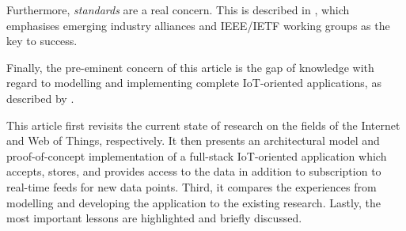 Furthermore, \textit{standards} are a real concern. This is described in \textcite{palattella-accettura-vilajosana-watteyne-gieco-boggia-dohler:standardized-protocol-stack-for-the-internet-of-important-things:2012}, which emphasises emerging industry alliances and IEEE/IETF working groups as the key to success.

Finally, the pre-eminent concern of this article is the gap of knowledge with regard to modelling and implementing complete IoT-oriented applications, as described by \textcite{paganelli-turchi-guili:a-web-of-things-framework-for-restful-applications-and-its-experimentation-in-a-smart-city:2014}.

This article first revisits the current state of research on the fields of the Internet and Web of Things, respectively. It then presents an architectural model and proof-of-concept implementation of a full-stack IoT-oriented application which accepts, stores, and provides access to the data in addition to subscription to real-time feeds for new data points. Third, it compares the experiences from modelling and developing the application to the existing research. Lastly, the most important lessons are highlighted and briefly discussed.
